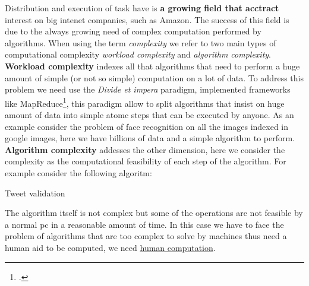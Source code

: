 




Distribution and execution of task have is \textbf{a growing field that acctract} interest on
big intenet companies, such as Amazon. The success of this field is due to the always growing
need of complex computation performed by algorithms. When using the term \emph{complexity}
we refer to two main types of computational complexity \emph{workload complexity} and
\emph{algorithm complexity}.\\

\textbf{Workload complexity} indexes all that algorithms that need to perform a huge amount
of simple (or not so simple) computation on a lot of data. To address this problem we need
use the \emph{Divide et impera} paradigm, implemented frameworks like
MapReduce\footcite{dean2008mapreduce}, this paradigm allow to split algorithms that insist
on huge amount of data into simple atomc steps that can be executed by anyone.
As an example consider the problem of face recognition on all the images indexed in google
images, here we have billions of data and a simple algorithm to perform.\\

\textbf{Algorithm complexity} addesses the other dimension, here we consider the complexity
as the computational feasibility of each step of the algorithm. For example consider the
following algoritm:\\
\begin{algorithm}[H]
	\caption{Tweet validation}
	\label{alg:intro_example}

	\BlankLine

\end{algorithm}
The algorithm itself is not complex but some of the operations are not feasible by a normal pc
in a reasonable amount of time.
In this case we have to face the problem of algorithms that are too complex to solve by
machines thus need a human aid to be computed, we need
\hyperref[sec:bg:crowd:human]{human computation}.\\

